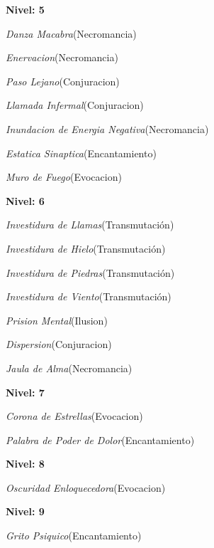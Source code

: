\documentclass[a4paper,twocolumn,openany,10pt]{dndbook}
\begin{document}
\begin{list}{}{}
	\item \textbf{Nivel: 5}
	\begin{list}{}{}
		\item \textit{Danza Macabra}(Necromancia)
		\item \textit{Enervacion}(Necromancia)
		\item \textit{Paso Lejano}(Conjuracion)
		\item \textit{Llamada Infermal}(Conjuracion)
		\item \textit{Inundacion de Energia Negativa}(Necromancia)
		\item \textit{Estatica Sinaptica}(Encantamiento)
		\item \textit{Muro de Fuego}(Evocacion)
	\end{list}

	\item \textbf{Nivel: 6}
	\begin{list}{}{}
		\item \textit{Investidura de Llamas}(Transmutación)
		\item \textit{Investidura de Hielo}(Transmutación)
		\item \textit{Investidura de Piedras}(Transmutación)
		\item \textit{Investidura de Viento}(Transmutación)
		\item \textit{Prision Mental}(Ilusion)
		\item \textit{Dispersion}(Conjuracion)
		\item \textit{Jaula de Alma}(Necromancia)
	\end{list}

	\item \textbf{Nivel: 7}
	\begin{list}{}{}
		\item \textit{Corona de Estrellas}(Evocacion)
		\item \textit{Palabra de Poder de Dolor}(Encantamiento)
	\end{list}

	\item \textbf{Nivel: 8}
	\begin{list}{}{}
		\item \textit{Oscuridad Enloquecedora}(Evocacion)
	\end{list}

	\item \textbf{Nivel: 9}
	\begin{list}{}{}
		\item \textit{Grito Psiquico}(Encantamiento)
	\end{list}
\end{list}
\end{document}
